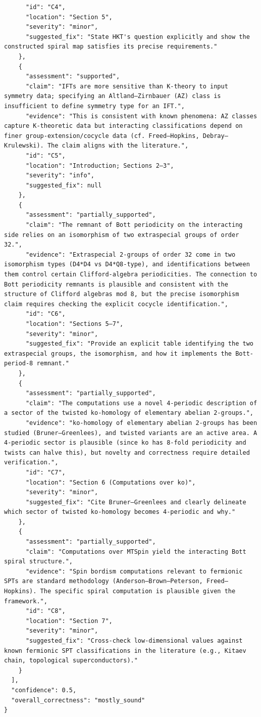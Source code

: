 \documentclass[11pt]{article}
\begin{document}
\begin{verbatim}
      "id": "C4",
      "location": "Section 5",
      "severity": "minor",
      "suggested_fix": "State HKT's question explicitly and show the constructed spiral map satisfies its precise requirements."
    },
    {
      "assessment": "supported",
      "claim": "IFTs are more sensitive than K-theory to input symmetry data; specifying an Altland–Zirnbauer (AZ) class is insufficient to define symmetry type for an IFT.",
      "evidence": "This is consistent with known phenomena: AZ classes capture K-theoretic data but interacting classifications depend on finer group-extension/cocycle data (cf. Freed–Hopkins, Debray–Krulewski). The claim aligns with the literature.",
      "id": "C5",
      "location": "Introduction; Sections 2–3",
      "severity": "info",
      "suggested_fix": null
    },
    {
      "assessment": "partially_supported",
      "claim": "The remnant of Bott periodicity on the interacting side relies on an isomorphism of two extraspecial groups of order 32.",
      "evidence": "Extraspecial 2-groups of order 32 come in two isomorphism types (D4*D4 vs D4*Q8-type), and identifications between them control certain Clifford-algebra periodicities. The connection to Bott periodicity remnants is plausible and consistent with the structure of Clifford algebras mod 8, but the precise isomorphism claim requires checking the explicit cocycle identification.",
      "id": "C6",
      "location": "Sections 5–7",
      "severity": "minor",
      "suggested_fix": "Provide an explicit table identifying the two extraspecial groups, the isomorphism, and how it implements the Bott-period-8 remnant."
    },
    {
      "assessment": "partially_supported",
      "claim": "The computations use a novel 4-periodic description of a sector of the twisted ko-homology of elementary abelian 2-groups.",
      "evidence": "ko-homology of elementary abelian 2-groups has been studied (Bruner–Greenlees), and twisted variants are an active area. A 4-periodic sector is plausible (since ko has 8-fold periodicity and twists can halve this), but novelty and correctness require detailed verification.",
      "id": "C7",
      "location": "Section 6 (Computations over ko)",
      "severity": "minor",
      "suggested_fix": "Cite Bruner–Greenlees and clearly delineate which sector of twisted ko-homology becomes 4-periodic and why."
    },
    {
      "assessment": "partially_supported",
      "claim": "Computations over MTSpin yield the interacting Bott spiral structure.",
      "evidence": "Spin bordism computations relevant to fermionic SPTs are standard methodology (Anderson–Brown–Peterson, Freed–Hopkins). The specific spiral computation is plausible given the framework.",
      "id": "C8",
      "location": "Section 7",
      "severity": "minor",
      "suggested_fix": "Cross-check low-dimensional values against known fermionic SPT classifications in the literature (e.g., Kitaev chain, topological superconductors)."
    }
  ],
  "confidence": 0.5,
  "overall_correctness": "mostly_sound"
}
\end{verbatim}
\end{document}
